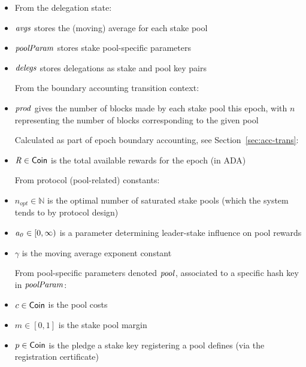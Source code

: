\begin{itemize}
\item[] From the delegation state:
\item $\mathit{avgs}$ stores the (moving) average for each
stake pool
\item $\mathit{poolParam}$ stores stake pool-specific parameters
\item $\mathit{delegs}$ stores delegations as stake and pool key pairs \medskip

From the boundary accounting transition context:
\item $\mathit{prod}$ gives the number of blocks made by each stake pool
this epoch, with $n$ representing the number of blocks corresponding to the
given pool \medskip

Calculated as part of epoch boundary accounting, see
Section~\ref{sec:acc-trans}:
\item $\mathit{R} \in \mathsf{Coin}$ is the total available rewards for the epoch (in ADA) \medskip

From protocol (pool-related) constants:
\item $n_{opt} \in \mathbb{N}$ is the optimal number of saturated stake pools (which the system
tends to by protocol design)
\item $\mathit{a_0} \in [0, \infty)$ is a parameter determining leader-stake
influence on pool rewards
\item $\gamma$ is the moving average exponent constant \medskip

From pool-specific parameters denoted $\mathit{pool}$, associated to a specific
hash key in $\mathit{poolParam}$:
\item $c \in \mathsf{Coin}$ is the pool costs
\item $m \in [0,1]$ is the stake pool margin
\item $p \in \mathsf{Coin}$ is the pledge a stake key registering a pool defines (via
the registration certificate)\medskip


\end{itemize}
